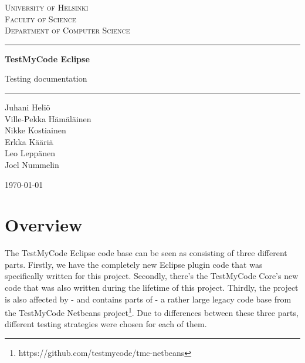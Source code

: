 \documentclass[12pt,a4paper,english,leqno]{article}
\begin{document}
\parskip 2mm
\parindent 0mm


\begin{titlepage}
  \setlength{\parindent}{0mm}
  \sloppy
  \large \textsc{University of Helsinki \\
  				 Faculty of Science\\
                 Department of Computer Science}
  \vspace{5mm}

  \hrule height3pt
  \vspace{20mm}

  \begin{center}
	\vfill  
  
    \begin{Huge} 
    \textbf{TestMyCode Eclipse}\\
    \end{Huge}
    \begin{LARGE}
    Testing documentation
    \end{LARGE}
    \vspace{20mm}

    \vfill

  \end{center}
  \hrule height2pt
  \vspace{5mm}

  \begin{small}
  Juhani Heliö\\
  Ville-Pekka Hämäläinen\\
  Nikke Kostiainen\\
  Erkka Kääriä\\
  Leo Leppänen\\
  Joel Nummelin\end{small} \hfill \today
  
\end{titlepage}


\section{Overview}

The TestMyCode Eclipse code base can be seen as consisting of three different parts.
Firstly, we have the completely new Eclipse plugin code that was specifically written for this project.
Secondly, there's the TestMyCode Core's new code that was also written during the lifetime of this project.
Thirdly, the project is also affected by - and contains parts of - a rather large legacy code base from the TestMyCode Netbeans project\footnote{https://github.com/testmycode/tmc-netbeans}.
Due to differences between these three parts, different testing strategies were chosen for each of them.
\end{document}
